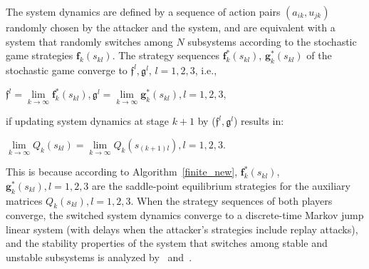 \begin{rem}
The system dynamics are defined by a sequence of action pairs $(a_{ik},u_{jk})$ randomly chosen by the attacker and the system, and are equivalent with a system that randomly switches among $N$ subsystems according to the stochastic game strategies $\mathbf{f}_k(s_{kl})$. The strategy sequences $\mathbf{f}_k^*(s_{kl})$, $\mathbf{g}_k^*(s_{kl})$ of the stochastic game converge to $\mathfrak{f}^l,\mathfrak{g}^l $, $l=1,2,3$, i.e.,
\\\centerline{$\mathfrak{f}^l=\lim\limits_{k\to\infty}\mathbf{f}_k^*(s_{kl}), \mathfrak{g}^l=\lim\limits_{k\to\infty}\mathbf{g}_k^*(s_{kl}), l=1,2,3,$}
if updating system dynamics at stage $k+1$ by ($\mathfrak{f}^l,\mathfrak{g}^l$) results in:
\\\centerline{$\lim \limits_{k \to \infty} Q_{k}(s_{kl})=\lim \limits_{k \to \infty} Q_{k}(s_{(k+1)l}), l=1,2,3.$}
This is because according to Algorithm~\ref{finite_new}, $\mathbf{f}^*_k(s_{kl})$, $\mathbf{g}^*_k(s_{kl}),l=1,2,3$ are the saddle-point equilibrium strategies for the auxiliary matrices $Q_{k}(s_{kl}),l=1,2,3$. When the strategy sequences of both players converge, the switched system dynamics converge to a discrete-time Markov jump linear system (with delays when the attacker's strategies include replay attacks), and the stability properties of the system that switches among stable and unstable subsystems is analyzed by~\cite{delay_mlj} and~\cite{switch_unstable}.\end{rem} 
